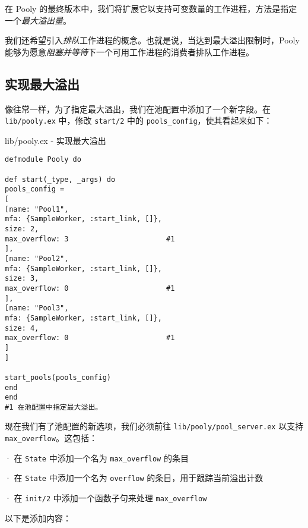 在 Pooly
的最终版本中，我们将扩展它以支持可变数量的工作进程，方法是指定一个\emph{最大溢出量}。

我们还希望引入\emph{排队}工作进程的概念。也就是说，当达到最大溢出限制时，Pooly
能够为愿意\emph{阻塞并等待}下一个可用工作进程的消费者排队工作进程。

\subsection{实现最大溢出}

像往常一样，为了指定最大溢出，我们在池配置中添加了一个新字段。在
\texttt{lib/pooly.ex} 中，修改
\texttt{start/2} 中的
\texttt{pools\_config}，使其看起来如下：

\begin{code}{lib/pooly.ex - 实现最大溢出}

\begin{verbatim}
defmodule Pooly do

def start(_type, _args) do
pools_config =
[
[name: "Pool1",
mfa: {SampleWorker, :start_link, []},
size: 2,
max_overflow: 3                       #1
],
[name: "Pool2",
mfa: {SampleWorker, :start_link, []},
size: 3,
max_overflow: 0                       #1
],
[name: "Pool3",
mfa: {SampleWorker, :start_link, []},
size: 4,
max_overflow: 0                       #1
]
]

start_pools(pools_config)
end
end
#1 在池配置中指定最大溢出。
\end{verbatim}
\end{code}


现在我们有了池配置的新选项，我们必须前往
\texttt{lib/pooly/pool\_server.ex} 以支持
\texttt{max\_overflow}。这包括：

· 在 \texttt{State} 中添加一个名为
\texttt{max\_overflow} 的条目

· 在 \texttt{State} 中添加一个名为
\texttt{overflow} 的条目，用于跟踪当前溢出计数

· 在 \texttt{init/2} 中添加一个函数子句来处理
\texttt{max\_overflow}

以下是添加内容：

